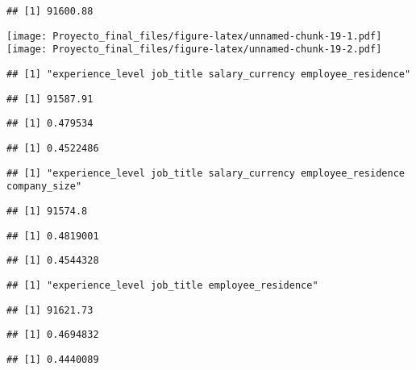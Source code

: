\documentclass[
]{article}
\begin{document}
\begin{verbatim}
## [1] 91600.88
\end{verbatim}

\texttt{[image: Proyecto\_final\_files/figure-latex/unnamed-chunk-19-1.pdf]}
\texttt{[image: Proyecto\_final\_files/figure-latex/unnamed-chunk-19-2.pdf]}

\begin{verbatim}
## [1] "experience_level job_title salary_currency employee_residence"
\end{verbatim}

\begin{verbatim}
## [1] 91587.91
\end{verbatim}

\begin{verbatim}
## [1] 0.479534
\end{verbatim}

\begin{verbatim}
## [1] 0.4522486
\end{verbatim}

\begin{verbatim}
## [1] "experience_level job_title salary_currency employee_residence company_size"
\end{verbatim}

\begin{verbatim}
## [1] 91574.8
\end{verbatim}

\begin{verbatim}
## [1] 0.4819001
\end{verbatim}

\begin{verbatim}
## [1] 0.4544328
\end{verbatim}

\begin{verbatim}
## [1] "experience_level job_title employee_residence"
\end{verbatim}

\begin{verbatim}
## [1] 91621.73
\end{verbatim}

\begin{verbatim}
## [1] 0.4694832
\end{verbatim}

\begin{verbatim}
## [1] 0.4440089
\end{verbatim}
\end{document}
